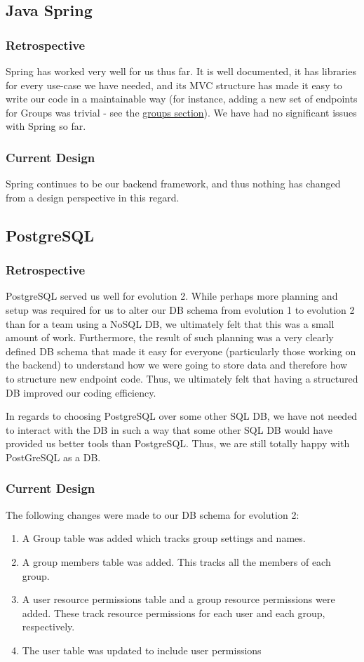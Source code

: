 \documentclass[12pt]{article}
\begin{document}
\subsection{Java Spring}
\subsubsection{Retrospective}
Spring has worked very well for us thus far. It is well documented, it has libraries for every use-case we have needed, and its MVC structure has made it easy to write our code in a maintainable way (for instance, adding a new set of endpoints for Groups was trivial - see the \hyperref[sec:GROUPS]{groups section}). We have had no significant issues with Spring so far. 

\subsubsection{Current Design}
Spring continues to be our backend framework, and thus nothing has changed from a design perspective in this regard.

\subsection{PostgreSQL}
\subsubsection{Retrospective}
PostgreSQL served us well for evolution 2. While perhaps more planning and setup was required for us to alter our DB schema from evolution 1 to evolution 2 than for a team using a NoSQL DB, we ultimately felt that this was a small amount of work. Furthermore, the result of such planning was a very clearly defined DB schema that made it easy for everyone (particularly those working on the backend) to understand how we were going to store data and therefore how to structure new endpoint code. Thus, we ultimately felt that having a structured DB improved our coding efficiency. 

In regards to choosing PostgreSQL over some other SQL DB, we have not needed to interact with the DB in such a way that some other SQL DB would have provided us better tools than PostgreSQL. Thus, we are still totally happy with PostGreSQL as a DB. 

\subsubsection{Current Design}
The following changes were made to our DB schema for evolution 2:
\begin{enumerate}
    \item A Group table was added which tracks group settings and names. 
    \item A group members table was added. This tracks all the members of each group. 
    \item A user resource permissions table and a group resource permissions were added. These track resource permissions for each user and each group, respectively. 
    \item The user table was updated to include user permissions
\end{enumerate}
\end{document}
